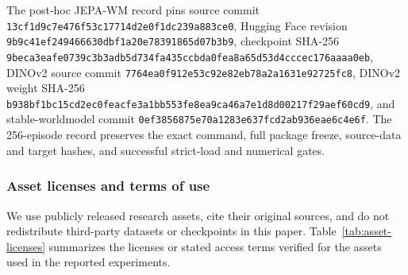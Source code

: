 {\color{black}The post-hoc JEPA-WM record pins source commit \texttt{13cf1d9c7e476f53\allowbreak c17714d2e0f1dc23\allowbreak 9a883ce0}, Hugging Face revision \texttt{9b9c41ef24946663\allowbreak 0dbf1a20e7839186\allowbreak 5d07b3b9}, checkpoint SHA-256 \texttt{9beca3eafe0739c3\allowbreak b3adb5d734fa435c\allowbreak cbda0fea8a65d53d\allowbreak 4cccec176aaaa0eb}, DINOv2 source commit \texttt{7764ea0f912e53c9\allowbreak 2e82eb78a2a1631e\allowbreak 92725fc8}, DINOv2 weight SHA-256 \texttt{b938bf1bc15cd2ec\allowbreak 0feacfe3a1bb553f\allowbreak e8ea9ca46a7e1d8d\allowbreak 00217f29aef60cd9}, and stable-worldmodel commit \texttt{0ef3856875e70a12\allowbreak 83e637fcd2ab936e\allowbreak ae6c4e6f}. The 256-episode record preserves the exact command, full package freeze, source-data and target hashes, and successful strict-load and numerical gates.}
\subsubsection{Asset licenses and terms of use}
\label{app:asset-licenses}
We use publicly released research assets, cite their original sources, and do not redistribute third-party datasets or checkpoints in this paper. Table~\ref{tab:asset-licenses} summarizes the licenses or stated access terms verified for the assets used in the reported experiments.

